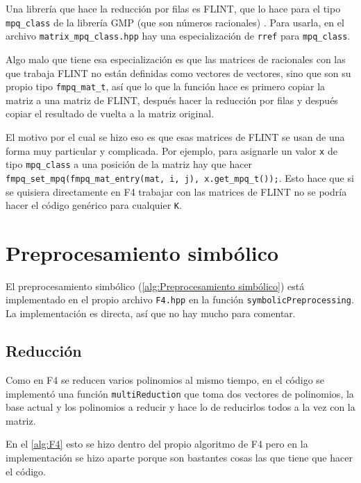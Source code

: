 \documentclass{report}
\theoremstyle{customstyle}
\theoremstyle{factstyle}
\begin{document}
Una librería que hace la reducción por filas es FLINT, que lo hace para el tipo \texttt{mpq\_class} de la librería GMP (que son números racionales) \cite{lib:flint, lib:gmp}. Para usarla, en el archivo \texttt{matrix\_mpq\_class.hpp} hay una especialización de \texttt{rref} para \texttt{mpq\_class}. %

Algo malo que tiene esa especialización es que las matrices de racionales con las que trabaja FLINT no están definidas como vectores de vectores, sino que son su propio tipo \texttt{fmpq\_mat\_t}, así que lo que la función hace es primero copiar la matriz a una matriz de FLINT, después hacer la reducción por filas y después copiar el resultado de vuelta a la matriz original.

El motivo por el cual se hizo eso es que esas matrices de FLINT se usan de una forma muy particular y complicada. Por ejemplo, para asignarle un valor \texttt{x} de tipo \texttt{mpq\_class} a una posición de la matriz hay que hacer \texttt{fmpq\_set\_mpq(fmpq\_mat\_entry(mat, i, j), x.get\_mpq\_t());}. Esto hace que si se quisiera directamente en F4 trabajar con las matrices de FLINT no se podría hacer el código genérico para cualquier \texttt{K}.

\section{Preprocesamiento simbólico}

El preprocesamiento simbólico (\cref{alg:Preprocesamiento simbólico}) está implementado en el propio archivo \texttt{F4.hpp} en la función \texttt{symbolicPreprocessing}. La implementación es directa, así que no hay mucho para comentar.

\subsection{Reducción}

Como en F4 se reducen varios polinomios al mismo tiempo, en el código se implementó una función \texttt{multiReduction} que toma dos vectores de polinomios, la base actual y los polinomios a reducir y hace lo de reducirlos todos a la vez con la matriz.

En el \cref{alg:F4} esto se hizo dentro del propio algoritmo de F4 pero en la implementación se hizo aparte porque son bastantes cosas las que tiene que hacer el código.
\end{document}
